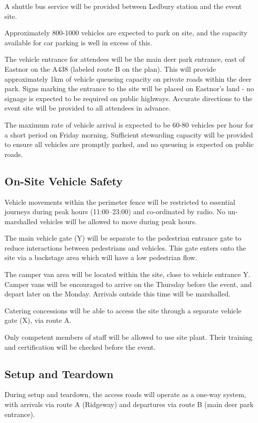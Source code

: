 A shuttle bus service will be provided between Ledbury station and the event
site.

Approximately 800-1000 vehicles are expected to park on site, and the capacity
available for car parking is well in excess of this.

The vehicle entrance for attendees will be the main deer park entrance, east of
Eastnor on the A438 (labeled route B on the plan). This will provide
approximately 1km of vehicle queueing capacity on private roads within the deer
park. Signs marking the entrance to the site will be placed on Eastnor's land -
no signage is expected to be required on public highways. Accurate directions to
the event site will be provided to all attendees in advance.

The maximum rate of vehicle arrival is expected to be 60-80 vehicles per hour
for a short period on Friday morning. Sufficient stewarding capacity will be
provided to ensure all vehicles are promptly parked, and no queueing is expected
on public roads.

\subsection{On-Site Vehicle Safety}\label{vehiclesafety}

Vehicle movements within the perimeter fence will be restricted to essential
journeys during peak hours (11:00--23:00) and co-ordinated by radio. No
un-marshalled vehicles will be allowed to move during peak hours.

The main vehicle gate (Y) will be separate to the pedestrian entrance gate
to reduce interactions between pedestrians and vehicles. This gate enters
onto the site via a backstage area which will have a low pedestrian flow.

The camper van area will be located within the site, close to vehicle
entrance Y. Camper vans will be encouraged to arrive on the Thursday before
the event, and depart later on the Monday. Arrivals outside this time will be
marshalled.

Catering concessions will be able to access the site through a separate
vehicle gate (X), via route A.

Only competent members of staff will be allowed to use site plant. Their
training and certification will be checked before the event.

\subsection{Setup and Teardown}
During setup and teardown, the access roads will operate as
a one-way system, with arrivals via route A (Ridgeway) and departures via
route B (main deer park entrance).

